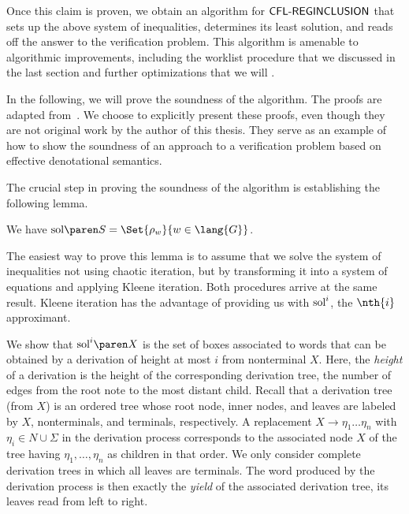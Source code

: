 \documentclass[../../diss.tex]{subfiles}
\begin{document}
Once this claim is proven, we obtain an algorithm for $\mathsf{CFL\text{-}REGINCLUSION}$ that sets up the above system of inequalities, determines its least solution, and reads off the answer to the verification problem.
This algorithm is amenable to algorithmic improvements, including the worklist procedure that we discussed in the last section and further optimizations that we will .

In the following, we will prove the soundness of the algorithm.
The proofs are adapted from~\cite{HolikM15}.
We choose to explicitly present these proofs, even though they are not original work by the author of this thesis.
They serve as an example of how to show the soundness of an approach to a verification problem based on effective denotational semantics.

%
\cheatpagebreak
%

The crucial step in proving the soundness of the algorithm is establishing the following lemma.

\begin{lemma}%
\label{Lemma:EDSRegInclSoundness}%
    We have $\sol{S} = \Set{ \tbox{w} }{ w \in \lang{G}}$.
\end{lemma}

The easiest way to prove this lemma is to assume that we solve the system of inequalities not using chaotic iteration, but by transforming it into a system of equations and applying Kleene iteration.
Both procedures arrive at the same result.
Kleene iteration has the advantage of providing us with $\text{sol}^{i}$, the $\nth{i}$ approximant.

We show that $\sol{i}{X}$ is the set of boxes associated to words that can be obtained by a derivation of height at most $i$ from nonterminal $X$.
Here, the \emph{height} of a derivation is the height of the corresponding derivation tree, \ie the number of edges from the root note to the most distant child.
Recall that a derivation tree (from $X$) is an ordered tree whose root node, inner nodes, and leaves are labeled by $X$, nonterminals, and terminals, respectively.
A replacement $X \to \eta_1 \ldots \eta_n$ with $\eta_i \in N \cup \Sigma$ in the derivation process corresponds to the associated node $X$ of the tree having $\eta_1, \ldots, \eta_n$ as children in that order.
We only consider complete derivation trees in which all leaves are terminals.
The word produced by the derivation process is then exactly the \emph{yield} of the associated derivation tree, \ie its leaves read from left to right.
\end{document}
